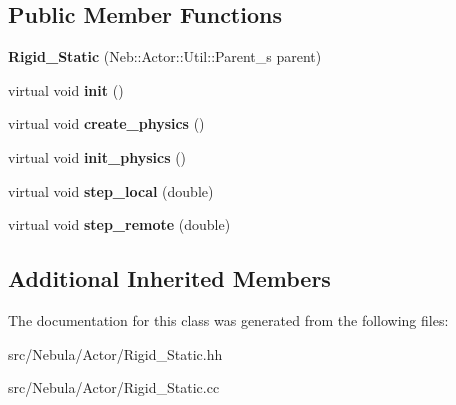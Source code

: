 \subsection*{Public Member Functions}
\begin{DoxyCompactItemize}
\item 
\hypertarget{classNeb_1_1Actor_1_1Rigid__Static_ae6cc095311ed8f4f6676df6cf8bbd138}{{\bfseries Rigid\-\_\-\-Static} (Neb\-::\-Actor\-::\-Util\-::\-Parent\-\_\-s parent)}\label{classNeb_1_1Actor_1_1Rigid__Static_ae6cc095311ed8f4f6676df6cf8bbd138}

\item 
\hypertarget{classNeb_1_1Actor_1_1Rigid__Static_acf3c4aab2ac0908e8d99afdb5c6fd7e9}{virtual void {\bfseries init} ()}\label{classNeb_1_1Actor_1_1Rigid__Static_acf3c4aab2ac0908e8d99afdb5c6fd7e9}

\item 
\hypertarget{classNeb_1_1Actor_1_1Rigid__Static_a2ffe179c864cd2572e9c92f2b2ea9c63}{virtual void {\bfseries create\-\_\-physics} ()}\label{classNeb_1_1Actor_1_1Rigid__Static_a2ffe179c864cd2572e9c92f2b2ea9c63}

\item 
\hypertarget{classNeb_1_1Actor_1_1Rigid__Static_a743ebf9c4e047adf672e3eacd88978d8}{virtual void {\bfseries init\-\_\-physics} ()}\label{classNeb_1_1Actor_1_1Rigid__Static_a743ebf9c4e047adf672e3eacd88978d8}

\item 
\hypertarget{classNeb_1_1Actor_1_1Rigid__Static_a66a9cc916cbcab9ffa9ad6b59fa20f54}{virtual void {\bfseries step\-\_\-local} (double)}\label{classNeb_1_1Actor_1_1Rigid__Static_a66a9cc916cbcab9ffa9ad6b59fa20f54}

\item 
\hypertarget{classNeb_1_1Actor_1_1Rigid__Static_a848ce7ac85a565add902b15bc75942b8}{virtual void {\bfseries step\-\_\-remote} (double)}\label{classNeb_1_1Actor_1_1Rigid__Static_a848ce7ac85a565add902b15bc75942b8}

\end{DoxyCompactItemize}
\subsection*{Additional Inherited Members}


The documentation for this class was generated from the following files\-:\begin{DoxyCompactItemize}
\item 
src/\-Nebula/\-Actor/Rigid\-\_\-\-Static.\-hh\item 
src/\-Nebula/\-Actor/Rigid\-\_\-\-Static.\-cc\end{DoxyCompactItemize}
